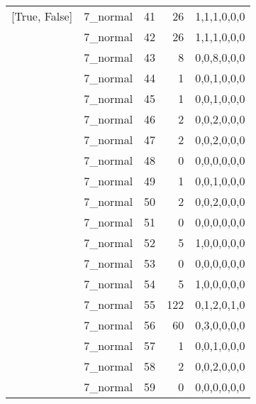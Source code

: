 \begin{tabular}{llrrl}
 [True, False]   & 7\_normal            &            41 &                    26 & 1,1,1,0,0,0   \\
 [True, False]   & 7\_normal            &            42 &                    26 & 1,1,1,0,0,0   \\
 [True, False]   & 7\_normal            &            43 &                     8 & 0,0,8,0,0,0   \\
 [True, False]   & 7\_normal            &            44 &                     1 & 0,0,1,0,0,0   \\
 [True, False]   & 7\_normal            &            45 &                     1 & 0,0,1,0,0,0   \\
 [True, False]   & 7\_normal            &            46 &                     2 & 0,0,2,0,0,0   \\
 [True, False]   & 7\_normal            &            47 &                     2 & 0,0,2,0,0,0   \\
 [True, False]   & 7\_normal            &            48 &                     0 & 0,0,0,0,0,0   \\
 [True, False]   & 7\_normal            &            49 &                     1 & 0,0,1,0,0,0   \\
 [True, False]   & 7\_normal            &            50 &                     2 & 0,0,2,0,0,0   \\
 [True, False]   & 7\_normal            &            51 &                     0 & 0,0,0,0,0,0   \\
 [True, False]   & 7\_normal            &            52 &                     5 & 1,0,0,0,0,0   \\
 [True, False]   & 7\_normal            &            53 &                     0 & 0,0,0,0,0,0   \\
 [True, False]   & 7\_normal            &            54 &                     5 & 1,0,0,0,0,0   \\
 [True, False]   & 7\_normal            &            55 &                   122 & 0,1,2,0,1,0   \\
 [True, False]   & 7\_normal            &            56 &                    60 & 0,3,0,0,0,0   \\
 [True, False]   & 7\_normal            &            57 &                     1 & 0,0,1,0,0,0   \\
 [True, False]   & 7\_normal            &            58 &                     2 & 0,0,2,0,0,0   \\
 [True, False]   & 7\_normal            &            59 &                     0 & 0,0,0,0,0,0   \\

\end{tabular}
